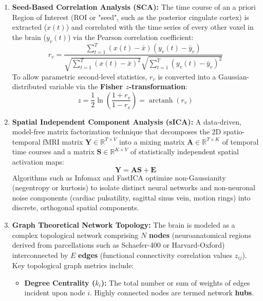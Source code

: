 \documentclass[11pt,a4paper]{article}
\begin{document}
\begin{enumerate}[leftmargin=2em]
    \item \textbf{Seed-Based Correlation Analysis (SCA):} The time course of an a priori Region of Interest (ROI or "seed", such as the posterior cingulate cortex) is extracted ($x(t)$) and correlated with the time series of every other voxel in the brain ($y_v(t)$) via the Pearson correlation coefficient:
    \begin{equation}
        r_v = \frac{\sum_{t=1}^T (x(t) - \bar{x})(y_v(t) - \bar{y}_v)}{\sqrt{\sum_{t=1}^T (x(t) - \bar{x})^2} \sqrt{\sum_{t=1}^T (y_v(t) - \bar{y}_v)^2}}
    \end{equation}
    To allow parametric second-level statistics, $r_v$ is converted into a Gaussian-distributed variable via the \textbf{Fisher $z$-transformation}:
    \begin{equation}
        z = \frac{1}{2} \ln \left( \frac{1 + r_v}{1 - r_v} \right) = \operatorname{arctanh}(r_v)
    \end{equation}
    \item \textbf{Spatial Independent Component Analysis (sICA):} A data-driven, model-free matrix factorization technique that decomposes the 2D spatio-temporal fMRI matrix $\mathbf{Y} \in \mathbb{R}^{T \times V}$ into a mixing matrix $\mathbf{A} \in \mathbb{R}^{T \times K}$ of temporal time courses and a matrix $\mathbf{S} \in \mathbb{R}^{K \times V}$ of statistically independent spatial activation maps:
    \begin{equation}
        \mathbf{Y} = \mathbf{A} \mathbf{S} + \mathbf{E}
    \end{equation}
    Algorithms such as Infomax and FastICA optimize non-Gaussianity (negentropy or kurtosis) to isolate distinct neural networks and non-neuronal noise components (cardiac pulsatility, sagittal sinus vein, motion rings) into discrete, orthogonal spatial components.
    \item \textbf{Graph Theoretical Network Topology:} The brain is modeled as a complex topological network comprising $N$ \textbf{nodes} (neuroanatomical regions derived from parcellations such as Schaefer-400 or Harvard-Oxford) interconnected by $E$ \textbf{edges} (functional connectivity correlation values $z_{ij}$). Key topological graph metrics include:
    \begin{itemize}
        \item \textbf{Degree Centrality ($k_i$):} The total number or sum of weights of edges incident upon node $i$. Highly connected nodes are termed network \textbf{hubs}.

\end{itemize}
\end{enumerate}
\end{document}
